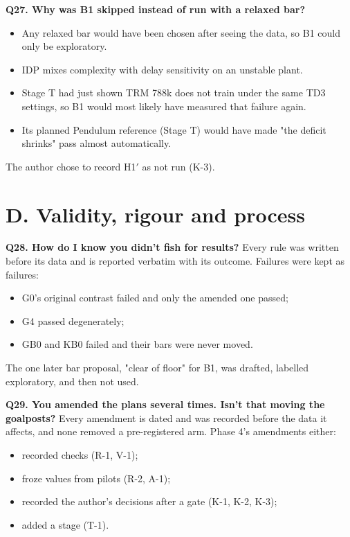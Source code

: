 \documentclass[11pt]{article}
\begin{document}
\textbf{Q27. Why was B1 skipped instead of run with a relaxed bar?}

\begin{itemize}
\item Any relaxed bar would have been chosen after seeing the data, so B1 could only be exploratory.
\item IDP mixes complexity with delay sensitivity on an unstable plant.
\item Stage T had just shown TRM 788k does not train under the same TD3 settings, so B1 would most likely have measured that failure again.
\item Its planned Pendulum reference (Stage T) would have made "the deficit shrinks" pass almost automatically.
\end{itemize}



The author chose to record H1$'$ as not run (K-3).



\section*{D. Validity, rigour and process}



\textbf{Q28. How do I know you didn't fish for results?} Every rule was written before its data and is reported verbatim with its outcome. Failures were kept as failures:

\begin{itemize}
\item G0's original contrast failed and only the amended one passed;
\item G4 passed degenerately;
\item GB0 and KB0 failed and their bars were never moved.
\end{itemize}



The one later bar proposal, "clear of floor" for B1, was drafted, labelled exploratory, and then not used.



\textbf{Q29. You amended the plans several times. Isn't that moving the goalposts?} Every amendment is dated and was recorded before the data it affects, and none removed a pre-registered arm. Phase 4's amendments either:

\begin{itemize}
\item recorded checks (R-1, V-1);
\item froze values from pilots (R-2, A-1);
\item recorded the author's decisions after a gate (K-1, K-2, K-3);
\item added a stage (T-1).
\end{itemize}
\end{document}
